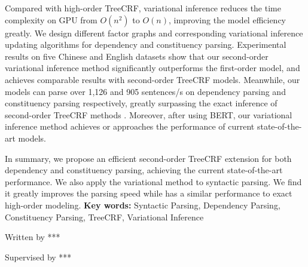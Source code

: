 \begin{eabstract}
\begin{enumerate}
		      Compared with high-order TreeCRF, variational inference reduces the time complexity on GPU from $O(n^2)$ to $O(n)$, improving the model efficiency greatly.
		      We design different factor graphs and corresponding variational inference updating algorithms for dependency and constituency parsing.
		      Experimental results on five Chinese and English datasets show that our second-order variational inference method significantly outperforms the first-order model, and achieves comparable results with second-order TreeCRF models.
		      Meanwhile, our models can parse over 1,126 and 905 sentences/s on dependency parsing and constituency parsing respectively, greatly surpassing the exact inference of second-order TreeCRF methods .
		      Moreover, after using BERT, our variational inference method achieves or approaches the performance of current state-of-the-art models.
	\end{enumerate}
	
	In summary, we propose an efficient second-order TreeCRF extension for both dependency and constituency parsing, achieving the current state-of-the-art performance.
	We also apply the variational method to syntactic parsing.
	We find it greatly improves the parsing speed while has a similar performance to exact high-order modeling.
	\vskip 21bp
	{\bf{} Key words: }
	Syntactic Parsing,
	Dependency Parsing,
	Constituency Parsing,
	TreeCRF,
	Variational Inference
\end{eabstract}

\begin{flushright}
	Written by ***
	
	Supervised by ***
\end{flushright}
